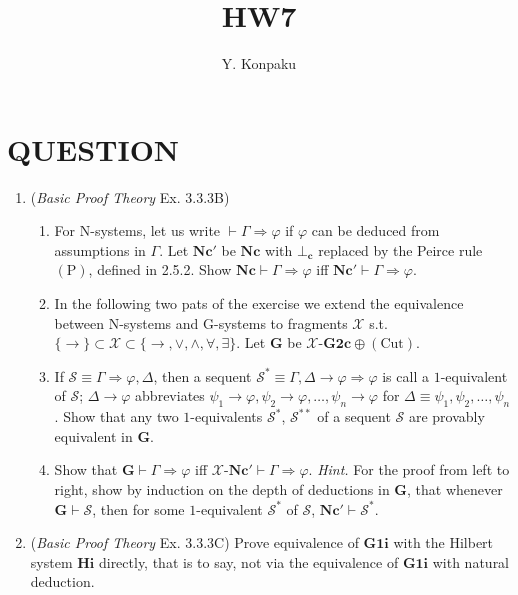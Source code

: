 \documentclass[12pt]{article}
\newcommand\A{\varphi}
\newcommand\B{\psi}
\newcommand\GG\Gamma
\newcommand\D\Delta
\newcommand\TO\Rightarrow
\newcommand\PC[1]{\mathbf{#1}}
\newcommand\RAA{\bot_\mathbf{c}}
\newcommand\PLR{\mathrm{P}}
\begin{document}
\title{HW7}
\author{Y. Konpaku}

\maketitle

\section{QUESTION}
\begin{enumerate}
\item (\emph{Basic Proof Theory} Ex. 3.3.3B) \begin{enumerate}
    \item For $\mathrm{N}$-systems, let us write $\vdash\GG\TO\A$ if $\A$ can be deduced from assumptions in $\GG$. Let $\PC{Nc'}$ be $\PC{Nc}$ with $\RAA$ replaced by the Peirce rule $(\PLR)$, defined in 2.5.2. Show $\PC{Nc}\vdash\GG\TO\A$ iff $\PC{Nc'}\vdash\GG\TO\A$.
    
    \item[] In the following two pats of the exercise we extend the equivalence between $\mathrm{N}$-systems and $\mathrm{G}$-systems to fragments $\mathcal{X}$ s.t. $\{\to\}\subset\mathcal{X}\subset\{\to,\lor,\land,\forall,\exists\}$. Let $\PC{G}$ be $\mathcal{X}$-$\PC{G2c}\oplus\mathrm{(Cut)}$.
    
    \item If $\mathcal{S}\equiv\GG\TO\A,\D$, then a sequent $\mathcal{S}^*\equiv\GG,\D\to\A\TO\A$ is call a $1$-equivalent of $\mathcal{S}$; $\D\to\A$ abbreviates $\B_1\to\A,\B_2\to\A,\ldots,\B_n\to\A$ for $\D\equiv\B_1,\B_2,\ldots,\B_n$. Show that any two $1$-equivalents $\mathcal{S}^*$, $\mathcal{S}^{**}$ of a sequent $\mathcal{S}$ are provably equivalent in $\PC{G}$.
    
    \item Show that $\PC{G}\vdash\GG\TO\A$ iff $\mathcal{X}$-$\PC{Nc'}\vdash\GG\TO\A$. \emph{Hint.} For the proof from left to right, show by induction on the depth of deductions in $\PC{G}$, that whenever $\PC{G}\vdash\mathcal{S}$, then for some $1$-equivalent $\mathcal{S}^*$ of $\mathcal{S}$, $\PC{Nc}'\vdash\mathcal{S}^*$.
\end{enumerate}
\item (\emph{Basic Proof Theory} Ex. 3.3.3C) Prove equivalence of $\PC{G1i}$ with the Hilbert system $\PC{Hi}$ directly, that is to say, not via the equivalence of $\PC{G1i}$ with natural deduction.
\end{enumerate}
\end{document}
